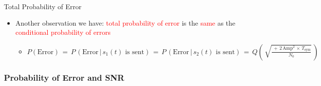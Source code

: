 \documentclass{Beamer}
\begin{document}
\begin{frame}[t,allowframebreaks]{Total Probability of Error}
\begin{itemize}
\item Another observation we have: \textcolor{red}{total probability of error} is the \textcolor{red}{same} as the \textcolor{red}{conditional probability of errors}

	\begin{itemize}
	\item $P(\text{Error}) \, = \,  P \, (\text{Error} \, | \, s_1(t) \text{ is sent}) \, = \, P \, (\text{Error} \, | \, s_2(t) \text{ is sent}) \, = \, Q \left(\, \displaystyle\sqrt{\frac{ \, + \, 2 \, \text{Amp}^2 \, \times \, T_{\text{sym}} }{N_0}}  \, \right)$
	\end{itemize}
\end{itemize}

\end{frame}

\subsubsection{Probability of Error and SNR}
\end{document}
